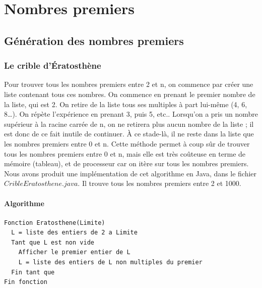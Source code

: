 \chapter{Nombres premiers}
	\section{Génération des nombres premiers}
		\subsection{Le crible d'Ératosthène}
			Pour trouver tous les nombres premiers entre 2 et n, on commence par créer une liste contenant tous ces nombres.
			On commence en prenant le premier nombre de la liste, qui est 2. On retire de la liste tous ses multiples à part lui-même (4, 6, 8…). On répète l’expérience en prenant 3, puis 5, etc..
			Lorsqu’on a pris un nombre supérieur à la racine carrée de n, on ne retirera plus aucun nombre de la liste ; il est donc de ce fait inutile de continuer.
			À ce stade-là, il ne reste dans la liste que les nombres premiers entre 0 et n. Cette méthode permet à coup sûr de trouver tous les nombres premiers entre 0 et n, mais elle est très coûteuse en terme de mémoire (tableau), et de processeur car on itère sur tous les nombres premiers. Nous avons produit une implémentation de cet algorithme en Java, dans le fichier $CribleEratosthene.java$. Il trouve tous les nombres premiers entre 2 et 1000.
			\subsubsection{Algorithme}
				\begin{lstlisting}
Fonction Eratosthene(Limite)
  L = liste des entiers de 2 a Limite
  Tant que L est non vide
    Afficher le premier entier de L
    L = liste des entiers de L non multiples du premier
  Fin tant que
Fin fonction
				\end{lstlisting}
